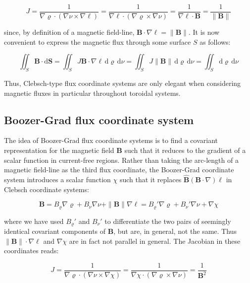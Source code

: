 \begin{equation}
    J=\frac{1}{\nabla\varrho\cdot(\nabla\nu\times\nabla\ell)}=\frac{1}{\nabla\ell\cdot(\nabla\varrho\times\nabla\nu)}=\frac{1}{\nabla\ell\cdot\mathbf{B}}=\frac{1}{\|\mathbf{B}\|}
\end{equation}

since, by definition of a magnetic field-line, $\mathbf{B}\cdot\nabla\ell=\|\mathbf{B}\|$. It is now convenient to express the magnetic flux through some surface $S$ as follows:

\begin{equation}
    \iint_S\mathbf{B}\cdot\mathrm{d}\mathbf{S}=\iint_SJ\mathbf{B}\cdot\nabla\ell\,\mathrm{d}\varrho\,\mathrm{d}\nu=\iint_SJ\|\mathbf{B}\|\,\mathrm{d}\varrho\,\mathrm{d}\nu=\iint_S\mathrm{d}\varrho\,\mathrm{d}\nu
\end{equation}

Thus, Clebsch-type flux coordinate systems are only elegant when considering magnetic fluxes in particular throughout toroidal systems.

\subsection{Boozer-Grad flux coordinate system}

The idea of Boozer-Grad flux coordinate systems is to find a covariant representation for the magnetic field $\mathbf{B}$ such that it reduces to the gradient of a scalar function in current-free regions. Rather than taking the arc-length of a magnetic field-line as the third flux coordinate, the Boozer-Grad coordinate system introduces a scalar function $\chi$ such that it replaces $\mathbf{\hat{B}}(\mathbf{B}\cdot\nabla)\ell$ in Clebsch coordinate systems:

\begin{equation}
    \mathbf{B}=B_\varrho\nabla\varrho+B_\nu\nabla\nu+\|\mathbf{B}\|\nabla\ell=B_\varrho'\nabla\varrho+B_\nu'\nabla\nu+\nabla\chi
\end{equation}

where we have used $B_\varrho'$ and $B_\nu'$ to differentiate the two pairs of seemingly identical covariant components of $\mathbf{B}$, but are, in general, not the same. Thus $\|\mathbf{B}\|\cdot\nabla\ell$ and $\nabla\chi$ are in fact not parallel in general. The Jacobian in these coordinates reads:

\begin{equation}
    J=\frac{1}{\nabla\varrho\cdot(\nabla\nu\times\nabla\chi)}=\frac{1}{\nabla\chi\cdot(\nabla\varrho\times\nabla\nu)}=\frac{1}{\mathbf{B}^2}
\end{equation}

